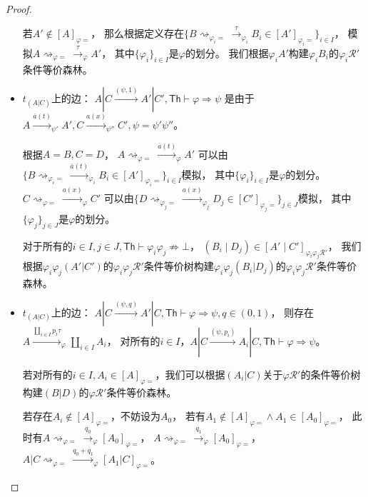 \begin{proof}
\begin{itemize}
{         若$A'\notin [A]_{\varphi =}$，
         那么根据定义存在$\{B\rightsquigarrow_{\varphi_i\mathcal{=}}\stackrel{\tau}{\rightarrow}_{\varphi_i}B_i\in [A']_{\varphi_i =}\}_{i\in I}$，
         模拟$A\rightsquigarrow_{\varphi =}\stackrel{\tau}{\rightarrow}_{\varphi} A'$，
         其中$\{\varphi_i\}_{i\in I}$是$\varphi$的划分。
         我们根据$\varphi_i A'$构建$\varphi_i B_i$的$\varphi_i \mathcal{R}'$条件等价森林。
      }
      \item {
         $t_{(A|C)}$上的边：
         $A|C\stackrel{(\psi, 1)}{\rightarrow} A'|C', \mathsf{Th}\vdash \varphi\Rightarrow\psi$
         是由于$A\stackrel{\overline{a}(t)}{\longrightarrow}_{\psi'} A', C\stackrel{a(x)}{\longrightarrow}_{\psi''} C', \psi=\psi'\psi''$。

         根据$A=B,C=D$，
         $A\rightsquigarrow_{\varphi = }\stackrel{\overline{a}(t)}{\longrightarrow}_{\varphi}A'$
         可以由$\{B\rightsquigarrow_{\varphi_i =}\stackrel{\overline{a}(t)}{\longrightarrow}_{\varphi_i}B_i\in [A']_{\varphi_i=}\}_{i\in I}$模拟，
         其中$\{\varphi_i\}_{i\in I}$是$\varphi$的划分。
         $C\rightsquigarrow_{\varphi = }\stackrel{a(x)}{\longrightarrow}_{\varphi}C'$
         可以由$\{D\rightsquigarrow_{\varphi_j =}\stackrel{a(x)}{\longrightarrow}_{\varphi_j}D_j\in [C']_{\varphi_j=}\}_{j\in J}$模拟，
         其中$\{\varphi_j\}_{j\in J}$是$\varphi$的划分。

         对于所有的$i\in I, j\in J, \mathsf{Th}\vdash \varphi_i\varphi_j\not\Rightarrow \bot$，
         $(B_i\mid D_j)\in[A'\mid C']_{\varphi_i\varphi_j \mathcal{R'}}$，
         我们根据$\varphi_i\varphi_j(A'|C')$的$\varphi_i\varphi_j \mathcal{R}' $条件等价树构建$\varphi_i\varphi_j(B_i|D_j)$的$\varphi_i\varphi_j \mathcal{R}' $条件等价森林。
      }
      \item {
         $t_{(A|C)}$上的边：
         $A|C\stackrel{(\psi, q)}{\rightarrow} A'|C, \mathsf{Th}\vdash \varphi\Rightarrow\psi, q\in(0,1)$，
         则存在$A\stackrel{\coprod_{i\in I}p_i\tau}{\longrightarrow}_{\varphi} \coprod_{i\in I} A_i$，
         对所有的$i\in I$，$A|C\stackrel{(\psi, p_i)}{\rightarrow} A_i|C, \mathsf{Th}\vdash \varphi\Rightarrow\psi$。

         若对所有的$i\in I, A_i\in[A]_{\varphi =}$，我们可以根据$(A_i|C)$关于$\varphi\mathcal{R}'$的条件等价树构建$(B|D)$的$\varphi\mathcal{R}'$条件等价森林。

         若存在$A_i\notin [A]_{\varphi =}$，不妨设为$A_0$，
         若有$A_1\notin[A]_{\varphi =}\wedge A_1\in [A_0]_{\varphi =}$，
         此时有$A\rightsquigarrow_{\varphi = }\stackrel{q_0}{\rightarrow}_{\varphi}[A_0]_{\varphi=}$，
         $A\rightsquigarrow_{\varphi = }\stackrel{q_1}{\rightarrow}_{\varphi}[A_0]_{\varphi=}$，
         $A|C\rightsquigarrow_{\varphi = }\stackrel{q_0+q_1}{\longrightarrow}_{\varphi}[A_1|C]_{\varphi=}$。

}
\end{itemize}
\end{proof}
